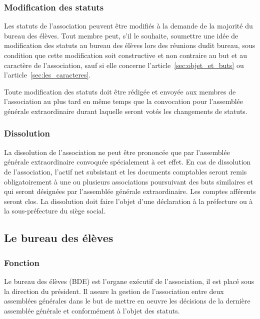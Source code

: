 \documentclass{article}
\begin{document}
			\subsubsection{Modification des statuts}
				Les statuts de l’association peuvent être modifiés à la demande
				de la majorité du bureau des élèves. Tout membre peut, s’il le
				souhaite, soumettre une idée de modification des statuts au
				bureau des élèves lors des réunions dudit bureau, sous condition
				que cette modification soit constructive et non contraire au but
				et au caractère de l’association, sauf si elle concerne
				l'article~\ref{sec:objet_et_buts} ou
				l'article~\ref{sec:les_caracteres}.

				Toute modification des statuts doit être rédigée et envoyée aux
				membres de l’association au plus tard en même temps que la
				convocation pour l’assemblée générale extraordinaire durant
				laquelle seront votés les changements de statuts.

			\subsubsection{Dissolution}
				La dissolution de l’association ne peut être prononcée que par
				l’assemblée générale extraordinaire convoquée spécialement à cet
				effet. En cas de dissolution de l’association, l’actif net
				subsistant et les documents comptables seront remis
				obligatoirement à une ou plusieurs associations poursuivant des
				buts similaires et qui seront désignées par l’assemblée générale
				extraordinaire. Les comptes afférents seront clos. La
				dissolution doit faire l’objet d’une déclaration à la préfecture
				ou à la sous-préfecture du siège social.

		\subsection{Le bureau des élèves}
\label{sub:le_bureau_des_eleves}
			\subsubsection{Fonction}
				Le bureau des élèves (BDE) est l'organe exécutif de
				l'association, il est placé sous la direction du président. Il
				assure la gestion de l'association entre deux assemblées
				générales dans le but de mettre en oeuvre les décisions de la
				dernière assemblée générale et conformément à l'objet des
				statuts.
\end{document}
